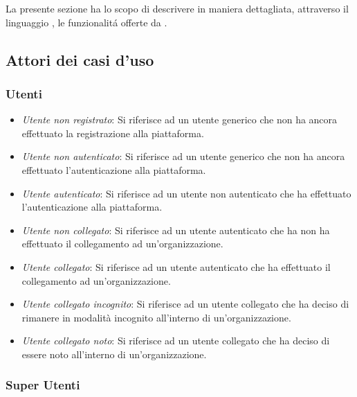 \documentclass[../analisi-dei-requisiti]{subfiles}
\begin{document}
La presente sezione ha lo scopo di descrivere in maniera dettagliata, attraverso il linguaggio , le funzionalitá offerte da .

\subsection{Attori dei casi d'uso}
\label{sub:attori_casi_duso}

\subsubsection{Utenti}
\label{subsub:utenti}

\begin{itemize}
  \item \emph{Utente non registrato}: Si riferisce ad un utente generico che non ha ancora effettuato la registrazione alla piattaforma.
  \item \emph{Utente non autenticato}: Si riferisce ad un utente generico che non ha ancora effettuato l'autenticazione alla piattaforma.
  \item \emph{Utente autenticato}: Si riferisce ad un utente non autenticato che ha effettuato l'autenticazione alla piattaforma.
  \item \emph{Utente non collegato}: Si riferisce ad un utente autenticato che ha non ha effettuato il collegamento ad un'organizzazione.
  \item \emph{Utente collegato}: Si riferisce ad un utente autenticato che ha effettuato il collegamento ad un'organizzazione.
  \item \emph{Utente collegato incognito}: Si riferisce ad un utente collegato che ha deciso di rimanere in modalità incognito all'interno di un'organizzazione.
  \item \emph{Utente collegato noto}: Si riferisce ad un utente collegato che ha deciso di essere noto all'interno di un'organizzazione.
\end{itemize}

\subsubsection{Super Utenti}
\label{subsub:super_utenti}
\end{document}
